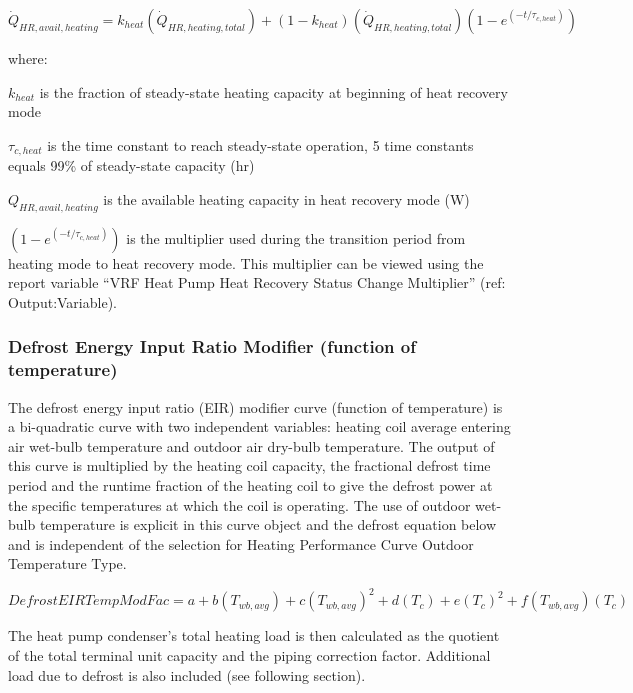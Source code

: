 \begin{equation}
  \dot{Q}_{HR,avail,heating} = k_{heat} \left( \dot{Q}_{HR,heating,total} \right) + \left( 1 - k_{heat} \right) \left( \dot{Q}_{HR,heating,total} \right) \left( 1 - e^{\left( -t / \tau_{c,heat} \right)} \right)
\end{equation}

where:

\(k_{heat}\) is the fraction of steady-state heating capacity at beginning of heat recovery mode

\(\tau_{c,heat}\) is the time constant to reach steady-state operation, 5 time constants equals 99\% of steady-state capacity (hr)

\(Q_{HR,avail,heating}\) is the available heating capacity in heat recovery mode (W)

\(\left( 1 - e^{\left( -t / \tau_{c,heat} \right)} \right)\) is the multiplier used during the transition period from heating mode to heat recovery mode. This multiplier can be viewed using the report variable ``VRF Heat Pump Heat Recovery Status Change Multiplier'' (ref: Output:Variable).

\subsubsection{Defrost Energy Input Ratio Modifier (function of temperature)}\label{defrost-energy-input-ratio-modifier-function-of-temperature}

The defrost energy input ratio (EIR) modifier curve (function of temperature) is a bi-quadratic curve with two independent variables: heating coil average entering air wet-bulb temperature and outdoor air dry-bulb temperature. The output of this curve is multiplied by the heating coil capacity, the fractional defrost time period and the runtime fraction of the heating coil to give the defrost power at the specific temperatures at which the coil is operating. The use of outdoor wet-bulb temperature is explicit in this curve object and the defrost equation below and is independent of the selection for Heating Performance Curve Outdoor Temperature Type.

\begin{equation}
  DefrostEIRTempModFac = a + b\left( {{T_{wb,avg}}} \right) + c{\left( {{T_{wb,avg}}} \right)^2} + d\left( {{T_c}} \right) + e{\left( {{T_c}} \right)^2} + f\left( {{T_{wb,avg}}} \right)\left( {{T_c}} \right)
\end{equation}

The heat pump condenser's total heating load is then calculated as the quotient of the total terminal unit capacity and the piping correction factor. Additional load due to defrost is also included (see following section).

